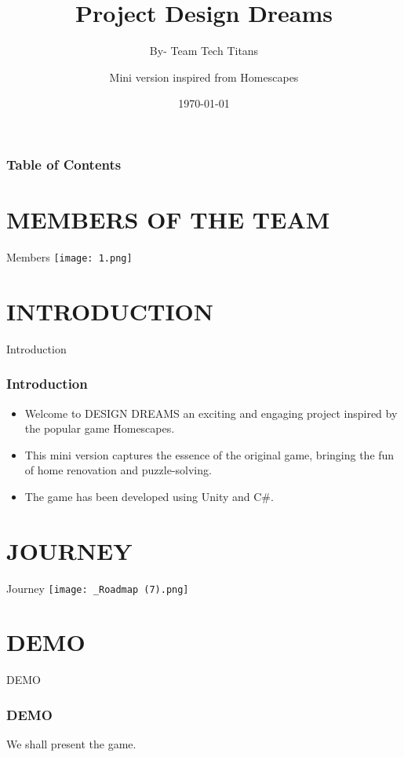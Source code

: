 \documentclass[10pt]{beamer}
\title[Tech Titans]{Project Design Dreams}
\subtitle{ By- Team Tech Titans}
\author[WE6]{Mini version inspired from Homescapes}
\institute[]{Project Presentation}
\date[\textcolor{white}{\today} ]
{\today}
\begin{document}
\frame{\titlepage}
\begin{frame}
\frametitle{Table of Contents}
\tableofcontents
\end{frame}


\section{MEMBERS OF THE TEAM}

\begin{frame}{Members}
        \texttt{[image: 1.png]}


  
\end{frame}

\section{INTRODUCTION}
    \begin{frame}{Introduction}
    \frametitle{Introduction}
        \begin{itemize}
            \item Welcome to DESIGN DREAMS an exciting and engaging project inspired by the popular game Homescapes. 
            \item This mini version captures the essence of the original game, bringing the fun of home renovation and puzzle-solving. 
            \item The game has been developed using Unity and C\#.
            
        \end{itemize}
    \end{frame}

\section{JOURNEY}
    \begin{frame}{Journey}
        \texttt{[image: \_Roadmap (7).png]}
\end{frame}

\section{DEMO}
    \begin{frame}{DEMO}
    \frametitle{DEMO}
    We shall present the game.
    \end{frame}
\end{document}
